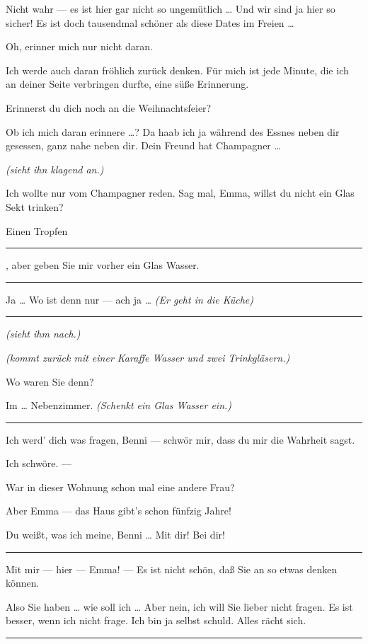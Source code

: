 \documentclass[
	final,
	a4paper,
	ngerman,
	mpinclude = true, %
	twoside = true,
	open = right,
	cleardoublepage = plain,
	DIV = 13,
	BCOR = 1cm,
	titlepage = firstiscover,
	]{scrbook}
\newcommand{\marginnote}[1]{\marginpar{\singlespacing\raggedright\footnotesize#1}}
\newcommand{\direction}[1]{\textit{(#1)}}
\newenvironment{deletion}{%
		\vspace{0.25\baselineskip}
		\hrule
		\vspace{0.25\baselineskip}
		\color{darkgray}
	}{
		\color{black}
		\vspace{0.25\baselineskip}
		\hrule 
		\vspace{0.25\baselineskip}
	}
\newcommand{\thecharacter}[1]{\textup{\textsc{#1}}\xspace}
\newcommand{\theherr}{\thecharacter{Benjamin}}
\newcommand{\thefrau}{\thecharacter{Emma}}
\newcommand{\character}[1]{\item[#1:]}
\newcommand{\herr}{\character{\theherr}}
\newcommand{\frau}{\character{\thefrau}}
\begin{document}
\begin{play}
	\herr
	Nicht wahr --- es ist hier gar nicht so ungemütlich \ldots{} Und wir sind ja hier so sicher! Es ist doch tausendmal schöner als diese Dates im Freien \ldots{}

	\frau
	Oh, erinner mich nur nicht daran.

	\herr
	Ich werde auch daran fröhlich zurück denken. Für mich ist jede Minute, die ich an deiner Seite verbringen durfte, eine süße Erinnerung.

	\frau
	Erinnerst du dich noch an die Weihnachtsfeier?

	\herr
	Ob ich mich daran erinnere \ldots{}? Da haab ich ja während des Essnes neben dir gesessen, ganz nahe neben dir. Dein Freund hat Champagner \ldots{}

	\frau
	\direction{sieht ihn klagend an.}

	\marginnote{\enquote{Für dich auch eine Nase, mein Hase?}}
	\herr
	Ich wollte nur vom Champagner reden. Sag mal, Emma, willst du nicht ein Glas Sekt trinken?

	\frau
	Einen Tropfen
	\begin{deletion}
		, aber geben Sie mir vorher ein Glas Wasser.
	\end{deletion}

	\herr
	Ja \ldots{} Wo ist denn nur --- ach ja \ldots{} \direction{Er geht in die Küche}

	\begin{deletion}
	\frau
	\direction{sieht ihm nach.}

	\herr
	\direction{kommt zurück mit einer Karaffe Wasser und zwei Trinkgläsern.}

	\frau
	Wo waren Sie denn?

	\herr
	Im \ldots{} Nebenzimmer. \direction{Schenkt ein Glas Wasser ein.}
	\end{deletion}

	\frau
	Ich werd' dich was fragen, Benni --- schwör mir, dass du mir die Wahrheit sagst.

	\herr
	Ich schwöre. ---

	\frau
	War in dieser Wohnung schon mal eine andere Frau?

	\herr
	Aber Emma --- das Haus gibt's schon fünfzig Jahre!

	\frau
	Du weißt, was ich meine, Benni \ldots{} Mit dir! Bei dir!

	\begin{deletion}
	\herr
	Mit mir --- hier --- Emma! --- Es ist nicht schön, daß Sie an so etwas denken können.

	\frau
	Also Sie haben \ldots{} wie soll ich \ldots{} Aber nein, ich will Sie lieber nicht fragen. Es ist besser, wenn ich nicht frage. Ich bin ja selbst schuld. Alles rächt sich.


\end{deletion}
\end{play}
\end{document}
